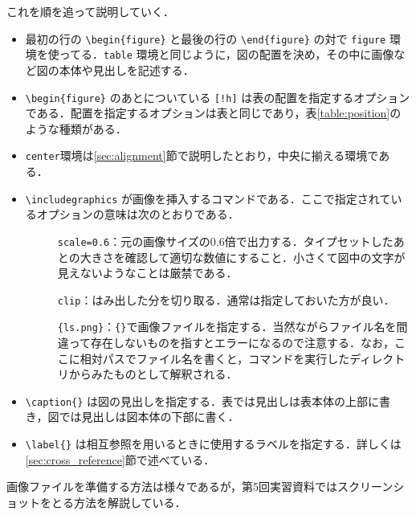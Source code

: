 これを順を追って説明していく．
\begin{itemize}
    \item 最初の行の \verb|\begin{figure}| と最後の行の \verb|\end{figure}| の対で \verb|figure| 環境を使ってる．\verb|table| 環境と同じように，図の配置を決め，その中に画像など図の本体や見出しを記述する．

    \item \verb|\begin{figure}| のあとについている \verb|[!h]| は表の配置を指定するオプションである．配置を指定するオプションは表と同じであり，表\ref{table:position}のような種類がある．
    \item \verb|center|環境は\ref{sec:alignment}節で説明したとおり，中央に揃える環境である．
    \item \verb|\includegraphics| が画像を挿入するコマンドである．ここで指定されているオプションの意味は次のとおりである．
    \begin{description}
        \item[] \verb+scale=0.6+：元の画像サイズの0.6倍で出力する．タイプセットしたあとの大きさを確認して適切な数値にすること．小さくて図中の文字が見えないようなことは厳禁である．
        \item[] \verb+clip+：はみ出した分を切り取る．通常は指定しておいた方が良い．
        \item[] \verb+{ls.png}+：\verb+{}+で画像ファイルを指定する．当然ながらファイル名を間違って存在しないものを指すとエラーになるので注意する．なお，ここに相対パスでファイル名を書くと，コマンドを実行したディレクトリからみたものとして解釈される．
    \end{description}
    \item \verb|\caption{}| は図の見出しを指定する．表では見出しは表本体の上部に書き，図では見出しは図本体の下部に書く．
    \item \verb|\label{}| は相互参照を用いるときに使用するラベルを指定する．詳しくは\ref{sec:cross_reference}節で述べている．
\end{itemize}
画像ファイルを準備する方法は様々であるが，第5回実習資料\cite{JJ1-5}ではスクリーンショットをとる方法を解説している．

